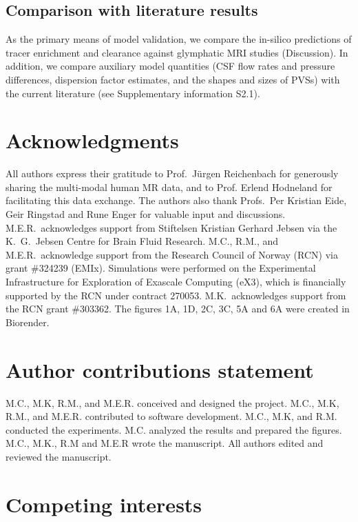 \documentclass[fleqn,10pt]{wlscirep}
\begin{document}
\subsection*{Comparison with literature results}

As the primary means of model validation, we compare the in-silico
predictions of tracer enrichment and clearance against glymphatic MRI
studies (Discussion). In addition, we compare auxiliary model
quantities (CSF flow rates and pressure differences, dispersion factor
estimates, and the shapes and sizes of PVSs) with the current
literature (see Supplementary information S2.1).

\section*{Acknowledgments}

All authors express their gratitude to Prof.~Jürgen Reichenbach for
generously sharing the multi-modal human MR data, and to Prof. Erlend
Hodneland for facilitating this data exchange. The authors also thank
Profs.~Per Kristian Eide, Geir Ringstad and Rune Enger for valuable
input and discussions. M.E.R.~acknowledges support from Stiftelsen
Kristian Gerhard Jebsen via the K.~G.~Jebsen Centre for Brain Fluid
Research. M.C., R.M., and M.E.R.~acknowledge support from the Research
Council of Norway (RCN) via grant \#324239 (EMIx). Simulations were
performed on the Experimental Infrastructure for Exploration of
Exascale Computing (eX3), which is financially supported by the RCN
under contract 270053. M.K.~acknowledges support from the RCN grant
\#303362. The figures 1A, 1D, 2C, 3C, 5A and 6A were created in
Biorender.

\section*{Author contributions statement}

M.C., M.K, R.M., and M.E.R. conceived and designed the project.
M.C., M.K, R.M., and M.E.R. contributed to software development. 
M.C., M.K, and R.M. conducted the experiments.
M.C. analyzed the results and prepared the figures.
M.C., M.K., R.M and M.E.R wrote the manuscript. 
All authors edited and reviewed the manuscript.

\section*{Competing interests}
\end{document}
